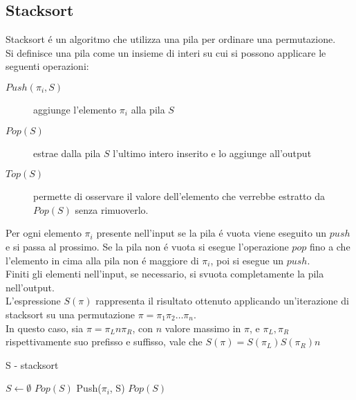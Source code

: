 \subsection*{Stacksort}
Stacksort \'e un algoritmo che utilizza una pila per ordinare una permutazione.\\ 
Si definisce una pila come un insieme di interi su cui si possono applicare le seguenti operazioni:
\begin{description}
   \item[$Push(\pi_i, S)$] aggiunge l'elemento $\pi_i$ alla pila $S$
   \item[$Pop(S)$] estrae dalla pila $S$ l'ultimo intero inserito e lo aggiunge all'output
   \item[$Top(S)$] permette di osservare il valore dell'elemento che verrebbe estratto da $Pop(S)$ senza rimuoverlo.
\end{description}
Per ogni elemento $\pi_i$ presente nell'input se la pila \'e vuota viene eseguito un $push$ e si passa al prossimo. Se la pila non \'e vuota si esegue l'operazione $pop$ fino a che l'elemento in cima alla pila non \'e maggiore di $\pi_i$, poi si esegue un $push$.\\
Finiti gli elementi nell'input, se necessario, si svuota completamente la pila nell'output.\cite{limbrief}\\
L'espressione $S(\pi)$ rappresenta il risultato ottenuto applicando un'iterazione di stacksort su una permutazione $\pi = \pi_1\pi_2\dots\pi_n$.\\
In questo caso, sia $\pi = \pi_Ln\pi_R$, con $n$ valore massimo in $\pi$, e $\pi_L, \pi_R$ rispettivamente suo prefisso e suffisso, vale che $S(\pi)=S(\pi_L)S(\pi_R)n$
\begin{algorithm}[H]
   \caption{S - stacksort}
\begin{algorithmic}[1]
\State $S\leftarrow\emptyset$
         \State $Pop(S)$
      \EndWhile
      \State Push($\pi_i$, S)
   \EndFor
      \State $Pop(S)$
   \EndWhile
\end{algorithmic}
\end{algorithm}
